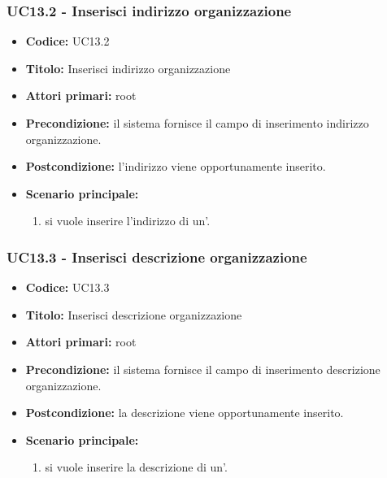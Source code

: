 \documentclass[casi-duso]{subfiles}
\begin{document}
\begin{itemize}
  \subsubsection{UC13.2 - Inserisci indirizzo organizzazione}
  \label{subsub:UC13.2}
  \begin{itemize}
    \item \textbf{Codice:} UC13.2
    \item \textbf{Titolo:} Inserisci indirizzo organizzazione
    \item \textbf{Attori primari:} root
    \item \textbf{Precondizione:} il sistema fornisce il campo di inserimento indirizzo organizzazione.
    \item \textbf{Postcondizione:} l'indirizzo viene opportunamente inserito.
    \item \textbf{Scenario principale:}
    \begin{enumerate}
      \item si vuole inserire l'indirizzo di un'.
    \end{enumerate}
  \end{itemize}
  
  \subsubsection{UC13.3 - Inserisci descrizione organizzazione}
  \label{subsub:UC13.3}
  \begin{itemize}
    \item \textbf{Codice:} UC13.3
    \item \textbf{Titolo:} Inserisci descrizione organizzazione
    \item \textbf{Attori primari:} root
    \item \textbf{Precondizione:} il sistema fornisce il campo di inserimento descrizione organizzazione.
    \item \textbf{Postcondizione:} la descrizione viene opportunamente inserito.
    \item \textbf{Scenario principale:}
    \begin{enumerate}
      \item si vuole inserire la descrizione di un'.
    \end{enumerate}
  \end{itemize}



\end{itemize}
\end{document}
